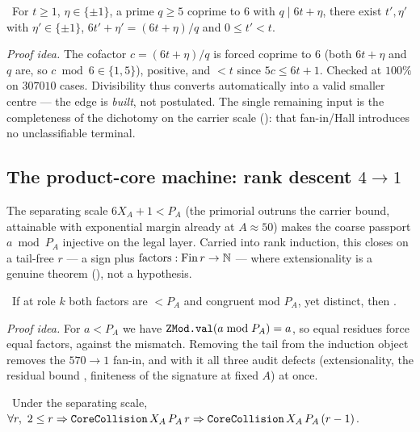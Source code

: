 \begin{theorem}\label{thm:cofactor_is_center}
\green{}\ For $t\ge1$, $\eta\in\{\pm1\}$, a prime $q\ge5$ coprime to $6$ with $q\mid 6t+\eta$, there
exist $t',\eta'$ with $\eta'\in\{\pm1\}$, $6t'+\eta'=(6t+\eta)/q$ and $0\le t'<t$.
\end{theorem}

\emph{Proof idea.} The cofactor $c=(6t+\eta)/q$ is forced coprime to $6$ (both $6t+\eta$ and $q$ are,
so $c\bmod6\in\{1,5\}$), positive, and $<t$ since $5c\le 6t+1$. Checked at $100\%$ on
$307010$ cases. Divisibility thus converts automatically into a valid smaller centre --- the edge is
\emph{built}, not postulated. The single remaining input is the completeness of the dichotomy on the
carrier scale (): that fan-in/Hall introduces no
unclassifiable terminal.

\subsection{The product-core machine: rank descent \texorpdfstring{$4\to1$}{4->1}}

The separating scale $6X_A+1<P_A$ (the primorial outruns the carrier bound, attainable with
exponential margin already at $A\approx50$) makes the coarse passport $a\bmod P_A$ injective on the
legal layer. Carried into rank induction, this closes  on a tail-free
 $r$ --- a sign plus $\mathrm{factors}:\mathrm{Fin}\,r\to\mathbb{N}$ --- where extensionality is
a genuine theorem (), not a hypothesis.

\begin{theorem}\label{thm:no_productHall}
\green{}\ If at role $k$ both factors are $<P_A$ and congruent mod $P_A$, yet distinct, then
. 
\end{theorem}

\emph{Proof idea.} For $a<P_A$ we have $\texttt{ZMod.val}(a\bmod P_A)=a$, so equal residues force equal
factors, against the mismatch. Removing the tail from the induction object removes the
$570\to1$ fan-in, and with it all three audit defects (extensionality, the residual bound
, finiteness of the signature at fixed $A$) at once.

\begin{theorem}\label{thm:core_step_proved}
\green{}\ Under the separating scale, $\forall r,\ 2\le r\Rightarrow\texttt{CoreCollision}\,X_A\,P_A\,r
\Rightarrow\texttt{CoreCollision}\,X_A\,P_A\,(r-1)$. 
\end{theorem}

